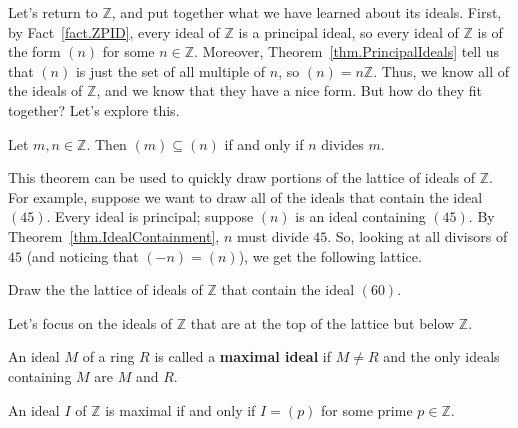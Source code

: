 Let's return to $\mathbb{Z}$, and put together what we have learned about its ideals. First, by Fact~\ref{fact.ZPID}, every ideal of $\mathbb{Z}$ is a principal ideal, so every ideal of $\mathbb{Z}$ is of the form $(n)$ for some $n\in \mathbb{Z}$. Moreover, Theorem~\ref{thm.PrincipalIdeals} tell us that $(n)$ is just the set of all multiple of $n$, so $(n) = n\mathbb{Z}$. Thus, we know all of the ideals of $\mathbb{Z}$, and we know that they have a nice form. But how do they fit together? Let's explore this.

\begin{theorem}\label{thm.IdealContainment}
Let $m,n \in \mathbb{Z}$. Then $(m) \subseteq (n)$ if and only if $n$ divides $m$.
\end{theorem}

This theorem can be used to quickly draw portions of the lattice of ideals of $\mathbb{Z}$. For example, suppose we want to draw all of the ideals that contain the ideal $(45)$. Every ideal is principal; suppose $(n)$ is an ideal containing $(45)$. By Theorem~\ref{thm.IdealContainment}, $n$ must divide $45$. So, looking at all divisors of $45$ (and noticing that $(-n) = (n)$), we get the following lattice. 
\begin{center}
\end{center}

\begin{problem}
Draw the the lattice of ideals of $\mathbb{Z}$ that contain the ideal $(60)$.
\end{problem}

Let's focus on the ideals of $\mathbb{Z}$ that are at the top of the lattice but below $\mathbb{Z}$.

\begin{definition}
An ideal $M$ of a ring $R$ is called a \textbf{maximal ideal} if $M\neq R$ and the only ideals containing $M$ are $M$ and $R$.
\end{definition}

\begin{theorem}
An ideal $I$ of $\mathbb{Z}$ is maximal if and only if $I=(p)$ for some prime $p\in \mathbb{Z}$.
\end{theorem}

